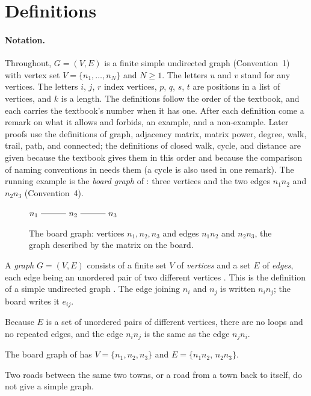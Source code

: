 \section{Definitions}\label{sec:definitions}

\paragraph{Notation.} Throughout, $G=(V,E)$ is a finite simple undirected graph (Convention~1) with vertex set $V=\{n_1,\dots,n_N\}$ and $N\ge 1$. The letters $u$ and $v$ stand for any vertices. The letters $i$, $j$, $r$ index vertices, $p$, $q$, $s$, $t$ are positions in a list of vertices, and $k$ is a length. The definitions follow the order of the textbook, and each carries the textbook's number when it has one. After each definition come a remark on what it allows and forbids, an example, and a non-example. Later proofs use the definitions of graph, adjacency matrix, matrix power, degree, walk, trail, path, and connected; the definitions of closed walk, cycle, and distance are given because the textbook gives them in this order and because the comparison of naming conventions in  needs them (a cycle is also used in one remark). The running example is the \emph{board graph} of : three vertices and the two edges $n_1n_2$ and $n_2n_3$ (Convention~4).

\begin{figure}[ht]
\centering
$n_1\ \rule[0.6ex]{3em}{0.4pt}\ n_2\ \rule[0.6ex]{3em}{0.4pt}\ n_3$
\caption{The board graph: vertices $n_1,n_2,n_3$ and edges $n_1n_2$ and $n_2n_3$, the graph described by the matrix on the board.}\label{fig:board}
\end{figure}

\begin{definition}\label{def:graph}
A \emph{graph} $G=(V,E)$ consists of a finite set $V$ of \emph{vertices} and a set $E$ of \emph{edges}, each edge being an unordered pair of two different vertices \cite[Def.~1.1.1, p.~9]{petrosyan2015grafneri}. This is the definition of a simple undirected graph \cite[Def.~1.1.1, p.~2]{uogalway_adjacency_notes}. The edge joining $n_i$ and $n_j$ is written $n_in_j$; the board writes it $e_{ij}$.
\end{definition}
\begin{remark}
Because $E$ is a set of unordered pairs of different vertices, there are no loops and no repeated edges, and the edge $n_in_j$ is the same as the edge $n_jn_i$.
\end{remark}
\begin{example}
The board graph of  has $V=\{n_1,n_2,n_3\}$ and $E=\{n_1n_2,\,n_2n_3\}$.
\end{example}
\begin{nonexample}
Two roads between the same two towns, or a road from a town back to itself, do not give a simple graph.
\end{nonexample}

